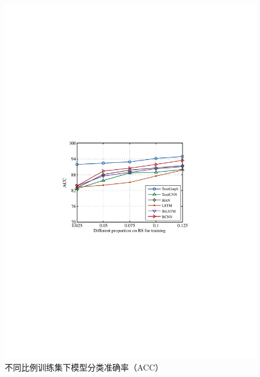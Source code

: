 \begin{figure}[htb]
    \begin{minipage}[t]{0.5\linewidth}
    \centering
    \includegraphics[width=1\textwidth]{pic/R8_acc.pdf}
    \caption{不同比例训练集下模型分类准确率（ACC）}
    \label{R8_acc}
    \end{minipage}
    \quad
    \begin{minipage}[t]{0.5\linewidth}
    \centering

\end{minipage}
\end{figure}
